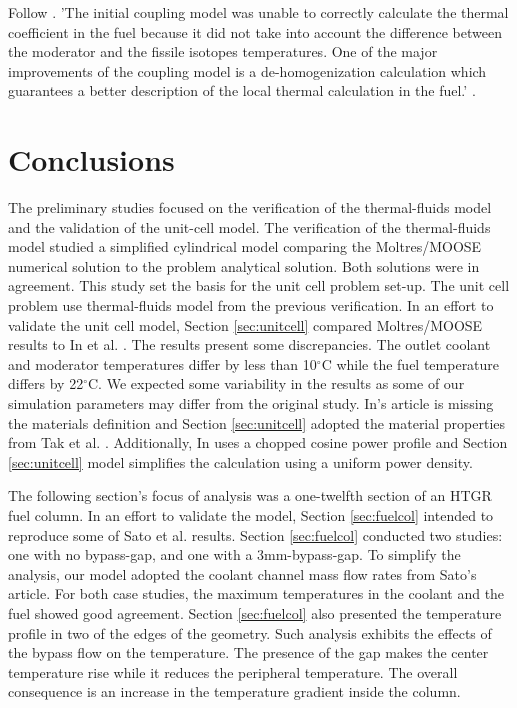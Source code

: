 

Follow \cite{j_ortensi_initial_2012}.
'The initial coupling model was unable to correctly calculate the thermal coefficient in the fuel because it did not take into account the difference between the moderator and the fissile isotopes temperatures.
One of the major improvements of the coupling model is a de-homogenization calculation which guarantees a better description of the local thermal calculation in the fuel.' \cite{damian_vhtr_2008}.


\section{Conclusions}

The preliminary studies focused on the verification of the thermal-fluids model and the validation of the unit-cell model.
The verification of the thermal-fluids model studied a simplified cylindrical model comparing the Moltres/MOOSE numerical solution to the problem analytical solution.
Both solutions were in agreement.
This study set the basis for the unit cell problem set-up.
The unit cell problem use thermal-fluids model from the previous verification.
In an effort to validate the unit cell model, Section \ref{sec:unitcell} compared Moltres/MOOSE results to In et al. \cite{in_three-dimensional_2006}.
The results present some discrepancies.
The outlet coolant and moderator temperatures differ by less than 10$^{\circ}$C while the fuel temperature differs by 22$^{\circ}$C.
We expected some variability in the results as some of our simulation parameters may differ from the original study.
In's article is missing the materials definition and Section \ref{sec:unitcell} adopted the material properties from Tak et al. \cite{tak_numerical_2008}.
Additionally, In uses a chopped cosine power profile and Section \ref{sec:unitcell} model simplifies the calculation using a uniform power density.

The following section's focus of analysis was a one-twelfth section of an HTGR fuel column.
In an effort to validate the model, Section \ref{sec:fuelcol} intended to reproduce some of Sato et al. \cite{sato_computational_2010} results.
Section \ref{sec:fuelcol} conducted two studies: one with no bypass-gap, and one with a 3mm-bypass-gap.
To simplify the analysis, our model adopted the coolant channel mass flow rates from Sato's article.
For both case studies, the maximum temperatures in the coolant and the fuel showed good agreement.
Section \ref{sec:fuelcol} also presented the temperature profile in two of the edges of the geometry.
Such analysis exhibits the effects of the bypass flow on the temperature.
The presence of the gap makes the center temperature rise while it reduces the peripheral temperature.
The overall consequence is an increase in the temperature gradient inside the column.

